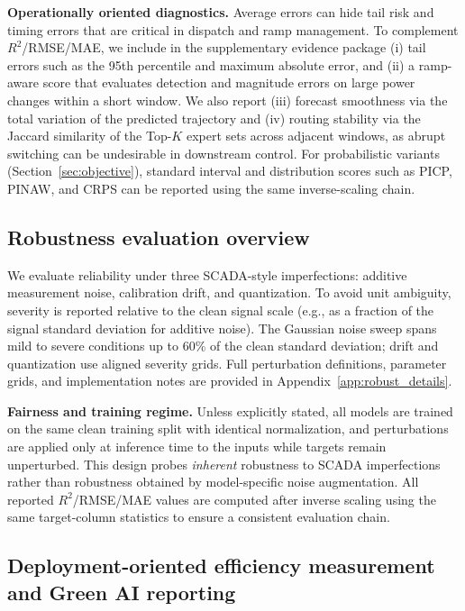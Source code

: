 \documentclass[review,3p,times]{elsarticle}
\begin{document}
\noindent\textbf{Operationally oriented diagnostics.}
Average errors can hide tail risk and timing errors that are critical in dispatch and ramp management. 
To complement $R^2$/RMSE/MAE, we include in the supplementary evidence package (i) tail errors such as the 95th percentile and maximum absolute error, and (ii) a ramp-aware score that evaluates detection and magnitude errors on large power changes within a short window.
We also report (iii) forecast smoothness via the total variation of the predicted trajectory and (iv) routing stability via the Jaccard similarity of the Top-$K$ expert sets across adjacent windows, as abrupt switching can be undesirable in downstream control.
For probabilistic variants (Section~\ref{sec:objective}), standard interval and distribution scores such as PICP, PINAW, and CRPS can be reported using the same inverse-scaling chain.

\subsection{Robustness evaluation overview}
\label{sec:robust_protocol}
We evaluate reliability under three SCADA-style imperfections: additive measurement noise, calibration drift, and quantization. To avoid unit ambiguity, severity is reported relative to the clean signal scale (e.g., as a fraction of the signal standard deviation for additive noise). The Gaussian noise sweep spans mild to severe conditions up to 60\% of the clean standard deviation; drift and quantization use aligned severity grids. Full perturbation definitions, parameter grids, and implementation notes are provided in Appendix~\ref{app:robust_details}.

\noindent\textbf{Fairness and training regime.}
Unless explicitly stated, all models are trained on the same clean training split with identical normalization, and perturbations are applied only at inference time to the inputs while targets remain unperturbed. 
This design probes \emph{inherent} robustness to SCADA imperfections rather than robustness obtained by model-specific noise augmentation. 
All reported $R^2$/RMSE/MAE values are computed after inverse scaling using the same target-column statistics to ensure a consistent evaluation chain.

\subsection{Deployment-oriented efficiency measurement and Green AI reporting}
\end{document}
